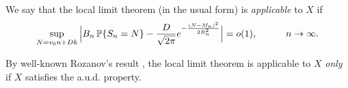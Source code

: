 \documentclass[11pt,draft,reqno]{amsart}
\makeatletter
\def\section{\@startsection{section}{1}%
     \z@{.7\linespacing\@plus\linespacing}{.5\linespacing}%
     {\bfseries%
     \centering
     }}
\theoremstyle{definition}
\theoremstyle{remarks}
\numberwithin{equation}{section}
\def \qq{{\qquad}}
\def\P{{\mathcal P}}
\def\E{{\mathbb E \,}}
\def\P{{\mathbb P}}
\def\Z{{\mathbb Z}}
\makeatother
\begin{document}
  We say  that the local limit theorem (in the usual form) is \emph{applicable} to   $X$    if
 \begin{equation}\label{def.llt.indep}    \sup_{N=v_0n+Dk }\Big|B_n\, {\mathbb P}\{S_n=N\}-{D\over  \sqrt{ 2\pi } }e^{-
{(N-M_n)^2\over  2 B_n^2} }\Big| = o(1), \qq \quad n\to\infty.
\end{equation} %
 

 

By   well-known Rozanov's result \cite{Ro}, 
the local limit theorem is applicable to   $X$  {\it only} if $X$ satisfies the a.u.d. property.
  
\end{document}
